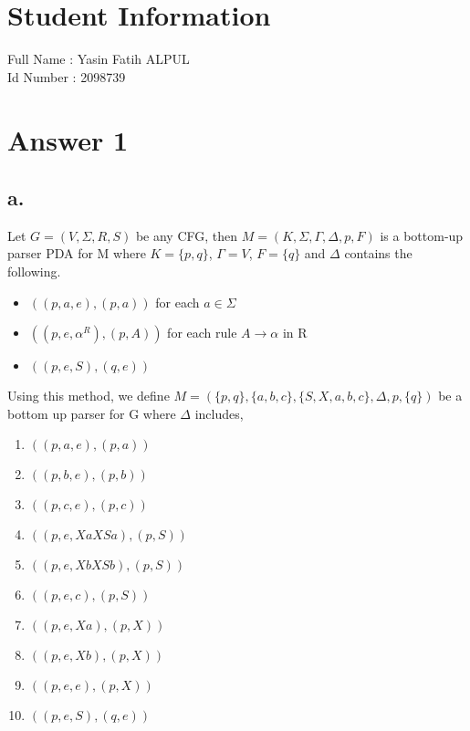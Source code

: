 \documentclass[12pt]{article}
\begin{document}
\section*{Student Information } 
Full Name :  Yasin Fatih ALPUL\\
Id Number :  2098739\\

\section*{Answer 1}
\subsection*{a.}
Let $G=(V,\Sigma, R, S)$ be any CFG, then $M=(K, \Sigma, \Gamma, \Delta, p, F)$ is a bottom-up parser PDA for M where $K=\{p,q\}$, $\Gamma=V$, $F=\{q\}$ and $\Delta$ contains the following.
\begin{itemize}
    \item $((p,a,e),(p,a))$ for each $a\in\Sigma$
    \item $((p,e,\alpha^R), (p, A))$ for each rule $A\rightarrow \alpha$ in R
    \item $((p,e,S), (q,e))$
\end{itemize}
Using this method, we define $M=(\{p,q\},\{a,b,c\}, \{S,X,a,b,c\},\Delta, p, \{q\})$ be a bottom up parser for G where $\Delta$ includes,
\begin{enumerate}
    \item $((p,a,e), (p,a))$
    \item $((p,b,e), (p,b))$
    \item $((p,c,e), (p,c))$
    \item $((p,e,XaXSa), (p,S))$
    \item $((p,e,XbXSb), (p,S))$
    \item $((p,e, c), (p, S))$
    \item $((p,e, Xa), (p, X))$
    \item $((p,e,Xb), (p,X))$
    \item $((p,e,e), (p, X))$
    \item $((p,e,S), (q,e))$
\end{enumerate}
\end{document}
